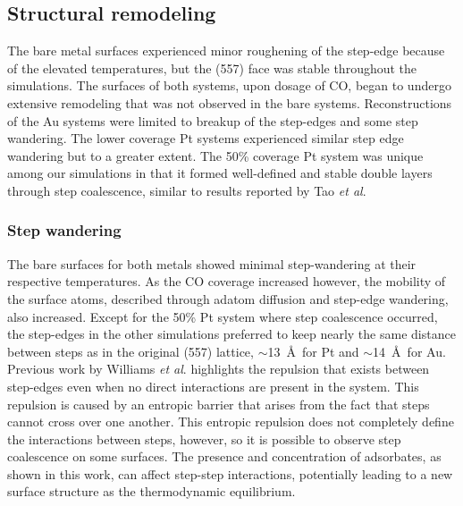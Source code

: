 \subsection{Structural remodeling}
The bare metal surfaces experienced minor roughening of the step-edge
because of the elevated temperatures, but the (557) face was stable
throughout the simulations. The surfaces of both systems, upon dosage
of CO, began to undergo extensive remodeling that was not observed in
the bare systems. Reconstructions of the Au systems were limited to
breakup of the step-edges and some step wandering. The lower coverage
Pt systems experienced similar step edge wandering but to a greater
extent. The 50\% coverage Pt system was unique among our simulations
in that it formed well-defined and stable double layers through step
coalescence, similar to results reported by Tao {\it et
  al}.\citep{Tao:2010aa}

\subsubsection{Step wandering}
The bare surfaces for both metals showed minimal step-wandering at
their respective temperatures. As the CO coverage increased however,
the mobility of the surface atoms, described through adatom diffusion
and step-edge wandering, also increased.  Except for the 50\% Pt
system where step coalescence occurred, the step-edges in the other
simulations preferred to keep nearly the same distance between steps
as in the original (557) lattice, $\sim$13~\AA~for Pt and
$\sim$14~\AA~for Au.  Previous work by Williams {\it et
  al}.\citep{Williams:1994aa, Williams:1991qd} highlights the repulsion
that exists between step-edges even when no direct interactions are
present in the system. This repulsion is caused by an entropic barrier
that arises from the fact that steps cannot cross over one
another. This entropic repulsion does not completely define the
interactions between steps, however, so it is possible to observe step
coalescence on some surfaces.\citep{Williams:1991qd} The presence and
concentration of adsorbates, as shown in this work, can affect
step-step interactions, potentially leading to a new surface structure
as the thermodynamic equilibrium.

